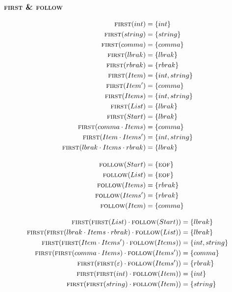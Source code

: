 \documentclass{report}
\newcommand{\Null}{\varepsilon}
\newcommand{\Seq}{\cdot}
\newcommand{\FIRST}{\textsc{first}}
\newcommand{\FOLLOW}{\textsc{follow}}
\newcommand{\EOF}{\textsc{eof}}
\newcommand{\NT}[1]{{#1}}
\newcommand{\T}[1]{{#1}}
\begin{document}
\subsubsection*{{\FIRST} \& {\FOLLOW}}
\begin{equation*}
  \begin{aligned}
    \FIRST(\T{int}) &= \{\T{int}\}\\
    \FIRST(\T{string}) &= \{\T{string}\}\\
    \FIRST(\T{comma}) &= \{\T{comma}\}\\
    \FIRST(\T{lbrak}) &= \{\T{lbrak}\}\\
    \FIRST(\T{rbrak}) &= \{\T{rbrak}\}\\
    \FIRST(\NT{Item}) &= \{\T{int}, \T{string}\}\\
    \FIRST(\NT{Item'}) &= \{\T{comma}\}\\
    \FIRST(\NT{Items}) &= \{\T{int}, \T{string}\}\\
    \FIRST(\NT{List}) &= \{\T{lbrak}\}\\
    \FIRST(\NT{Start}) &= \{\T{lbrak}\}\\
    \FIRST(\T{comma} \Seq \NT{Items}) &= \{\T{comma}\}\\
    \FIRST(\NT{Item} \Seq \NT{Items'}) &= \{\T{int}, \T{string}\}\\
    \FIRST(\T{lbrak} \Seq \NT{Items} \Seq \T{rbrak}) &= \{\T{lbrak}\}\\[1em]
    \FOLLOW(\NT{Start}) &= \{\EOF\}\\
    \FOLLOW(\NT{List}) &= \{\EOF\}\\
    \FOLLOW(\NT{Items}) &= \{\T{rbrak}\}\\
    \FOLLOW(\NT{Items'}) &= \{\T{rbrak}\}\\
    \FOLLOW(\NT{Item}) &= \{\T{comma}\}
  \end{aligned}
\end{equation*}

\begin{equation*}
  \begin{aligned}
    \FIRST(\FIRST(\T{List}) \Seq \FOLLOW(\NT{Start})) &= \{\T{lbrak}\}\\
    \FIRST(\FIRST(\T{lbrak} \Seq \NT{Items} \Seq \T{rbrak}) \Seq \FOLLOW(\NT{List})) &= \{\T{lbrak}\}\\
    \FIRST(\FIRST(\NT{Item} \Seq \NT{Items'}) \Seq \FOLLOW(\NT{Items})) &= \{\T{int, string}\}\\
    \FIRST(\FIRST(\T{comma} \Seq \NT{Items}) \Seq \FOLLOW(\NT{Items'})) &= \{\T{comma}\}\\
    \FIRST(\FIRST(\Null) \Seq \FOLLOW(\NT{Items'})) &= \{\T{rbrak}\}\\
    \FIRST(\FIRST(\T{int}) \Seq \FOLLOW(\NT{Item})) &= \{\T{int}\}\\
    \FIRST(\FIRST(\T{string}) \Seq \FOLLOW(\NT{Item})) &= \{\T{string}\}\\
  \end{aligned}
\end{equation*}
\end{document}
